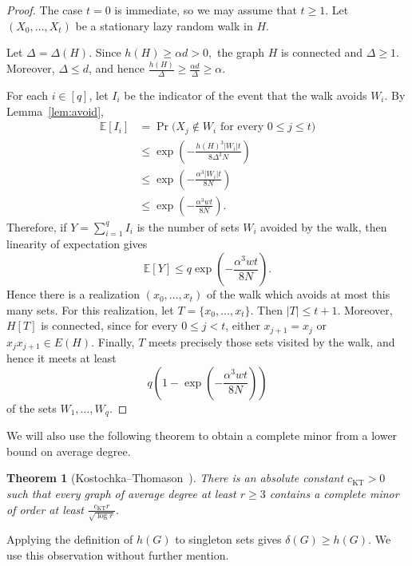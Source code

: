 \documentclass[11pt,a4paper]{article}
\newtheorem{theorem}{Theorem}[section]
\theoremstyle{definition}
\theoremstyle{remark}
\begin{document}
\begin{proof}
The case \(t=0\) is immediate, so we may assume that \(t\ge1\). Let \((X_0,\ldots,X_t)\) be a stationary lazy
random walk in \(H\).

Let \(\Delta=\Delta(H)\). Since
$h(H)\ge \alpha d>0,$
the graph \(H\) is connected and \(\Delta\ge1\). Moreover,
\(\Delta\le d\), and hence
$\frac{h(H)}{\Delta}\ge \frac{\alpha d}{\Delta}\ge \alpha.$

For each \(i\in[q]\), let \(I_i\) be the indicator of the event
that the walk avoids \(W_i\). By Lemma~\ref{lem:avoid},
\[
\begin{aligned}
\mathbb E[I_i]
&=\Pr\bigl(X_j\notin W_i
          \text{ for every }0\le j\le t\bigr)\\
&\le
\exp\left(
    -\frac{h(H)^3|W_i|t}{8\Delta^3N}
\right)\\
&\le
\exp\left(
    -\frac{\alpha^3|W_i|t}{8N}
\right)\\
&\le
\exp\left(
    -\frac{\alpha^3wt}{8N}
\right).
\end{aligned}
\]
Therefore, if
$Y=\sum_{i=1}^q I_i$
is the number of sets \(W_i\) avoided by the walk, then linearity
of expectation gives
\[
    \mathbb E[Y]
    \le
    q\exp\left(
        -\frac{\alpha^3wt}{8N}
    \right).
\]
Hence there is a realization
\((x_0,\ldots,x_t)\) of the walk which avoids at most this many
sets. For this realization, let
$T=\{x_0,\ldots,x_t\}.$
Then \(|T|\le t+1\). Moreover, \(H[T]\) is connected, since for
every \(0\le j<t\), either \(x_{j+1}=x_j\) or
\(x_jx_{j+1}\in E(H)\). Finally, \(T\) meets precisely those sets
visited by the walk, and hence it meets at least
\[
    q\left(
        1-\exp\left(
            -\frac{\alpha^3wt}{8N}
        \right)
    \right)
\]
of the sets \(W_1,\ldots,W_q\).
\end{proof}

We will also use the following theorem to obtain a complete minor from a lower bound on average degree.

\begin{theorem}
[Kostochka--Thomason~{\cite{Kostochka,Thomason1984}}]
\label{thm:KT}
There is an absolute constant $c_{\mathrm{KT}}>0$ such that every graph of
average degree at least $r\ge3$ contains a complete minor of order at
least $\frac{c_{\mathrm{KT}}r}{\sqrt{\log r}}$.
\end{theorem}

Applying the definition of $h(G)$ to singleton sets gives
$\delta(G)\ge h(G)$. We use this observation without further mention.
\end{document}

